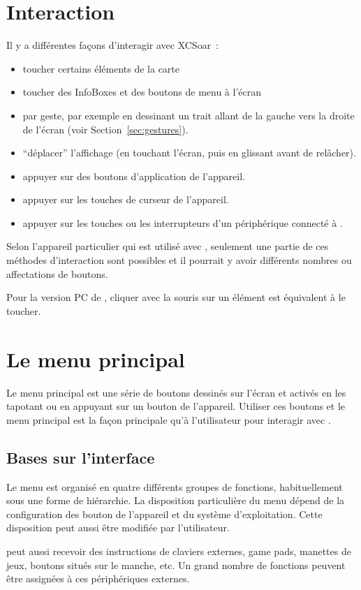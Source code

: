\section{Interaction}
Il y a différentes façons d'interagir avec XCSoar~:
\begin{itemize}
\item toucher certains éléments de la carte
\item toucher des InfoBoxes et des boutons de menu à l'écran
\item par geste, par exemple en dessinant un trait allant de la gauche vers la droite 
de l'écran (voir Section~\ref{sec:gestures}).
\item ``déplacer'' l'affichage (en touchant l'écran, puis en glissant avant de relâcher).
\item appuyer sur des boutons d'application de l'appareil.
\item appuyer sur les touches de curseur de l'appareil.
\item appuyer sur les touches ou les interrupteurs d'un périphérique connecté à \xc.
\end{itemize}
Selon l'appareil particulier qui est utilisé avec \xc, seulement une partie de ces méthodes
d'interaction sont possibles et il pourrait y avoir différents nombres ou affectations
de boutons.

Pour la version PC de \xc, cliquer avec la souris sur un élément est équivalent à
le toucher.

\section{Le menu principal}
Le menu principal est une série de boutons dessinés sur l'écran et activés en les tapotant
ou en appuyant sur un bouton de l'appareil. Utiliser ces boutons et le menu principal est la façon
principale qu'à l'utilisateur pour interagir avec \xc.

\subsection*{Bases sur l'interface}
Le menu est organisé en quatre différents groupes de fonctions, habituellement sous
une forme de hiérarchie. La disposition particulière du menu dépend de la configuration
des bouton de l'appareil et du système d'exploitation. Cette disposition peut aussi être modifiée par
l'utilisateur.

\xc{} peut aussi recevoir des instructions de claviers externes, game pads, manettes de jeux, 
boutons situés sur le manche, etc. Un grand nombre de fonctions peuvent être assignées à ces
périphériques externes.

